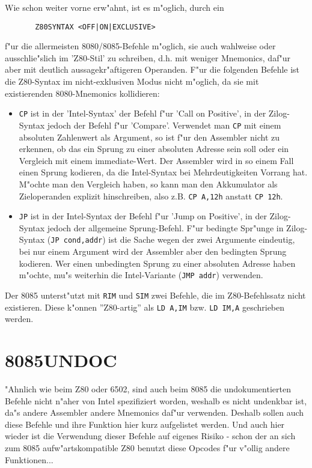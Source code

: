 \documentclass[12pt,a4paper,twoside]{report}
\newcommand{\tty}[1]{{\tt #1}}
\begin{document}
Wie schon weiter vorne erw"ahnt, ist es m"oglich, durch ein
\begin{verbatim}
       Z80SYNTAX <OFF|ON|EXCLUSIVE>
\end{verbatim}
f"ur die allermeisten 8080/8085-Befehle m"oglich, sie auch wahlweise
oder ausschlie"slich im 'Z80-Stil' zu schreiben, d.h. mit weniger
Mnemonics, daf"ur aber mit deutlich aussagekr"aftigeren Operanden.
F"ur die folgenden Befehle ist die Z80-Syntax im nicht-exklusiven Modus
nicht m"oglich, da sie mit existierenden 8080-Mnemonics kollidieren:
\begin{itemize}
\item{\tty{CP} ist in der 'Intel-Syntax' der Befehl f"ur 'Call on
      Positive', in der Zilog-Syntax jedoch der Befehl f"ur
      'Compare'.  Verwendet man \tty{CP} mit einem absoluten
      Zahlenwert als Argument, so ist f"ur den Assembler nicht zu
      erkennen, ob das ein Sprung zu einer absoluten Adresse sein
      soll oder ein Vergleich mit einem immediate-Wert.  Der
      Assembler wird in so einem Fall einen Sprung kodieren, da
      die Intel-Syntax bei Mehrdeutigkeiten Vorrang hat.  M"ochte
      man den Vergleich haben, so kann man den Akkumulator als
      Zieloperanden explizit hinschreiben, also z.B. \tty{CP A,12h}
      anstatt \tty{CP 12h}.}
\item{\tty{JP} ist in der Intel-Syntax der Befehl f"ur 'Jump on
      Positive', in der Zilog-Syntax jedoch der allgemeine
      Sprung-Befehl.  F"ur bedingte Spr"unge in Zilog-Syntax (\tty{JP
      cond,addr}) ist die Sache wegen der zwei Argumente eindeutig,
      bei nur einem Argument wird der Assembler aber den bedingten
      Sprung kodieren.  Wer einen unbedingten Sprung zu einer
      absoluten Adresse haben m"ochte, mu"s weiterhin die
      Intel-Variante (\tty{JMP addr}) verwenden.}
\end{itemize}
Der 8085 unterst"utzt mit \tty{RIM} und \tty{SIM} zwei Befehle, die
im Z80-Befehlssatz nicht existieren.  Diese k"onnen ''Z80-artig'' als
\tty{LD A,IM} bzw. \tty{LD IM,A} geschrieben werden.


\section{8085UNDOC}
\label{8085Spec}

"Ahnlich wie beim Z80 oder 6502, sind auch beim 8085 die undokumentierten
Befehle nicht n"aher von Intel spezifiziert worden, weshalb es nicht
undenkbar ist, da"s andere Assembler andere Mnemonics daf"ur verwenden.
Deshalb sollen auch diese Befehle und ihre Funktion hier kurz aufgelistet
werden.  Und auch hier wieder ist die Verwendung dieser Befehle auf
eigenes Risiko - schon der an sich zum 8085 aufw"artskompatible Z80
benutzt diese Opcodes f"ur v"ollig andere Funktionen...
\end{document}
